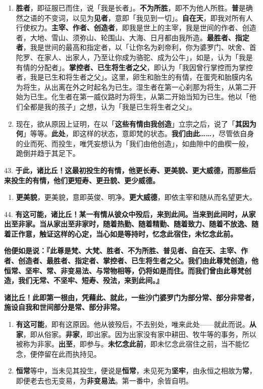 \begin{enumerate}\item \textbf{胜者}，即征服已而住，说「我是长者」。\textbf{不为所胜}，即不为他人所胜。\textbf{普}是确然之语的不变词，以见为\textbf{见者}，意即「我见到一切」。\textbf{自在天}，即我对所有人行使权力。\textbf{主宰、作者、创造者}，即我是世上的主宰，我是世间的作者、创造者，大地、雪山、须弥山、轮围山、大海、日月都由我所造。\textbf{最胜者、指定者}，我是世间的最高和指定者，以「让你名为刹帝利，你为婆罗门、吠舍、首陀罗、在家人、出家人，乃至让你成为骆驼、成为公牛」，如是，认为「我是有情的分配者」。\textbf{掌控者、已生将生者之父}，即认为「我因曾行掌控而为掌控者，我是已生和将生者之父」。这里，卵生和胎生的有情，在蛋壳和胎膜内名为将生，从出离在外之时起名为已生。湿生者在第一心刹那为将生，从第二开始为已生。化生者在第一威仪路时为将生，从第二开始当知为已生。他以「他们全都是我的孩子」之想，认为「我是已生将生者之父」。
\item 现在，欲从原因上证明，在以「\textbf{这些有情由我创造}」立宗之后，说了「\textbf{其因为何}」等等。\textbf{此处}，即这样的状态，意即梵的状态。\textbf{我们由此……}，尽管依自身的业而死、而投生，唯凭妄想认为「我们由他创造」，如曲隙中的曲楔一般，跪倒并趋于其足下。\end{enumerate}

{\Large 43.} \textbf{于此，诸比丘！这最初投生的有情，他更长寿、更美貌、更大威德，而那些后来投生的有情，他们更短寿、更丑貌、更少威德。}

\begin{enumerate}\item \textbf{更美貌}，更美貌，意即英俊、明净。\textbf{更大威德}，即依主宰和随从而名望更大。\end{enumerate}

{\Large 44.} \textbf{有这可能，诸比丘！某一有情从彼众中殁后，来到此间。当来到此间时，从家出至非家。当从家出至非家时，随着热勤、随着精勤、随着致力、随着不放逸、随着正作意，触证这样的心定，当心如是等持时，忆念此宿住，未忆念此前。}

\textbf{他便如是说：『此尊是梵、大梵、胜者、不为所胜、普见者、自在天、主宰、作者、创造者、最胜者、指定者、掌控者、已生将生者之父。我们由此尊梵创造，他恒常、坚牢、常、非变易法、与常物相等，仍将如是而住。而我们曾由此尊梵创造，我们无常、不坚牢、短寿、殁法，来到此间。』}

\textbf{诸比丘！此即第一根由，凭藉此、就此，一些沙门婆罗门为部分常、部分非常者，施设自我和世间部分是常、部分非常。}

\begin{enumerate}\item \textbf{有这可能}，即有这原因。他从彼殁后，不去别处，唯来此处——就此而说。\textbf{从家}，即从俗家。\textbf{非家}，即出家。因为出家没有家中耕田、牧牛等的事务，所以被称为非家。\textbf{出至}，即参与。\textbf{未忆念此前}，即未忆念此宿住之前，当不能忆念，便停留在此而执持见。
\item \textbf{恒常}等中，当未见其投生，便说是\textbf{恒常}，未见死为\textbf{坚牢}，由永恒之相故为\textbf{常}，即便老去也无变易，为\textbf{非变易法}。第一番中，余皆自明。\end{enumerate}

